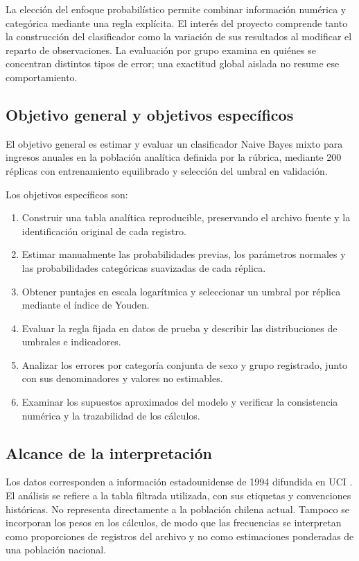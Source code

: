 \documentclass[11pt,a4paper]{article}
\newcommand{\archivo}[1]{\path{#1}}
\begin{document}
La elección del enfoque probabilístico permite combinar información numérica y categórica mediante una regla explícita. El interés del proyecto comprende tanto la construcción del clasificador como la variación de sus resultados al modificar el reparto de observaciones. La evaluación por grupo examina en quiénes se concentran distintos tipos de error; una exactitud global aislada no resume ese comportamiento.

\subsection{Objetivo general y objetivos específicos}
El objetivo general es estimar y evaluar un clasificador Naive Bayes mixto para ingresos anuales en la población analítica definida por la rúbrica, mediante 200 réplicas con entrenamiento equilibrado y selección del umbral en validación.

Los objetivos específicos son:
\begin{enumerate}
\item Construir una tabla analítica reproducible, preservando el archivo fuente y la identificación original de cada registro.
\item Estimar manualmente las probabilidades previas, los parámetros normales y las probabilidades categóricas suavizadas de cada réplica.
\item Obtener puntajes en escala logarítmica y seleccionar un umbral por réplica mediante el índice de Youden.
\item Evaluar la regla fijada en datos de prueba y describir las distribuciones de umbrales e indicadores.
\item Analizar los errores por categoría conjunta de sexo y grupo registrado, junto con sus denominadores y valores no estimables.
\item Examinar los supuestos aproximados del modelo y verificar la consistencia numérica y la trazabilidad de los cálculos.
\end{enumerate}

\subsection{Alcance de la interpretación}
Los datos corresponden a información estadounidense de 1994 difundida en UCI \cite{uci}. El análisis se refiere a la tabla filtrada utilizada, con sus etiquetas y convenciones históricas. No representa directamente a la población chilena actual. Tampoco se incorporan los pesos \archivo{fnlwgt} en los cálculos, de modo que las frecuencias se interpretan como proporciones de registros del archivo y no como estimaciones ponderadas de una población nacional.
\end{document}
